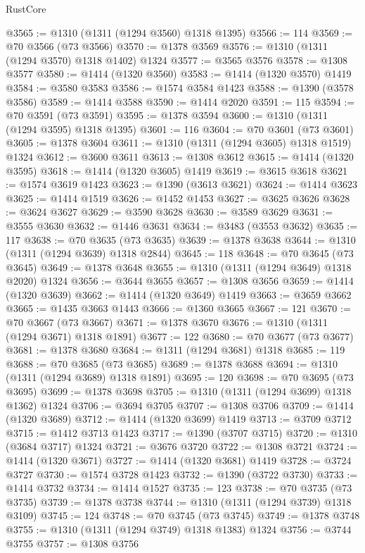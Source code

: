 \begin{lexlean}{RustCore}
\begin{coremodule}
@3565 := @1310 (@1311 (@1294 @3560) @1318 @1395)
@3566 := 114
@3569 := @70 @3566 (@73 @3566)
@3570 := @1378 @3569
@3576 := @1310 (@1311 (@1294 @3570) @1318 @1402) @1324
@3577 := @3565 @3576
@3578 := @1308 @3577
@3580 := @1414 (@1320 @3560)
@3583 := @1414 (@1320 @3570) @1419
@3584 := @3580 @3583
@3586 := @1574 @3584 @1423
@3588 := @1390 (@3578 @3586)
@3589 := @1414 @3588
@3590 := @1414 @2020
@3591 := 115
@3594 := @70 @3591 (@73 @3591)
@3595 := @1378 @3594
@3600 := @1310 (@1311 (@1294 @3595) @1318 @1395)
@3601 := 116
@3604 := @70 @3601 (@73 @3601)
@3605 := @1378 @3604
@3611 := @1310 (@1311 (@1294 @3605) @1318 @1519) @1324
@3612 := @3600 @3611
@3613 := @1308 @3612
@3615 := @1414 (@1320 @3595)
@3618 := @1414 (@1320 @3605) @1419
@3619 := @3615 @3618
@3621 := @1574 @3619 @1423
@3623 := @1390 (@3613 @3621)
@3624 := @1414 @3623
@3625 := @1414 @1519
@3626 := @1452 @1453
@3627 := @3625 @3626
@3628 := @3624 @3627
@3629 := @3590 @3628
@3630 := @3589 @3629
@3631 := @3555 @3630
@3632 := @1446 @3631
@3634 := @3483 (@3553 @3632)
@3635 := 117
@3638 := @70 @3635 (@73 @3635)
@3639 := @1378 @3638
@3644 := @1310 (@1311 (@1294 @3639) @1318 @2844)
@3645 := 118
@3648 := @70 @3645 (@73 @3645)
@3649 := @1378 @3648
@3655 := @1310 (@1311 (@1294 @3649) @1318 @2020) @1324
@3656 := @3644 @3655
@3657 := @1308 @3656
@3659 := @1414 (@1320 @3639)
@3662 := @1414 (@1320 @3649) @1419
@3663 := @3659 @3662
@3665 := @1435 @3663 @1443
@3666 := @1360 @3665
@3667 := 121
@3670 := @70 @3667 (@73 @3667)
@3671 := @1378 @3670
@3676 := @1310 (@1311 (@1294 @3671) @1318 @1891)
@3677 := 122
@3680 := @70 @3677 (@73 @3677)
@3681 := @1378 @3680
@3684 := @1311 (@1294 @3681) @1318
@3685 := 119
@3688 := @70 @3685 (@73 @3685)
@3689 := @1378 @3688
@3694 := @1310 (@1311 (@1294 @3689) @1318 @1891)
@3695 := 120
@3698 := @70 @3695 (@73 @3695)
@3699 := @1378 @3698
@3705 := @1310 (@1311 (@1294 @3699) @1318 @1362) @1324
@3706 := @3694 @3705
@3707 := @1308 @3706
@3709 := @1414 (@1320 @3689)
@3712 := @1414 (@1320 @3699) @1419
@3713 := @3709 @3712
@3715 := @1412 @3713 @1423
@3717 := @1390 (@3707 @3715)
@3720 := @1310 (@3684 @3717) @1324
@3721 := @3676 @3720
@3722 := @1308 @3721
@3724 := @1414 (@1320 @3671)
@3727 := @1414 (@1320 @3681) @1419
@3728 := @3724 @3727
@3730 := @1574 @3728 @1423
@3732 := @1390 (@3722 @3730)
@3733 := @1414 @3732
@3734 := @1414 @1527
@3735 := 123
@3738 := @70 @3735 (@73 @3735)
@3739 := @1378 @3738
@3744 := @1310 (@1311 (@1294 @3739) @1318 @3109)
@3745 := 124
@3748 := @70 @3745 (@73 @3745)
@3749 := @1378 @3748
@3755 := @1310 (@1311 (@1294 @3749) @1318 @1383) @1324
@3756 := @3744 @3755
@3757 := @1308 @3756

\end{coremodule}
\end{lexlean}
